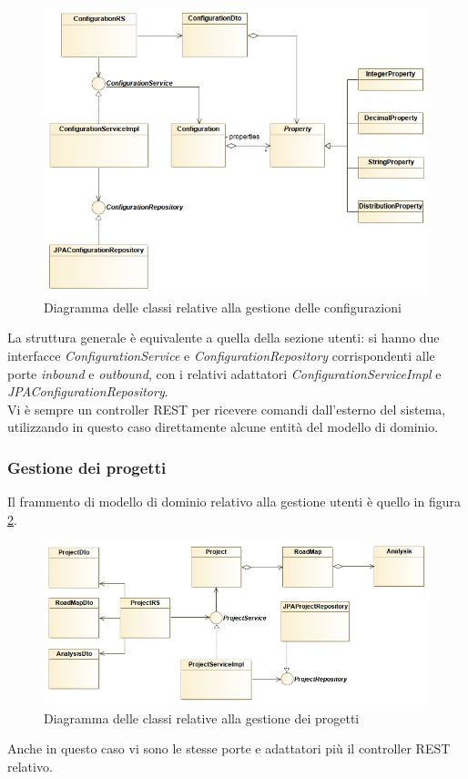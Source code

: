 \begin{figure}[h]
	\centering
	\includegraphics[width=\textwidth]{img/configurations_diagram}
	\caption{Diagramma delle classi relative alla gestione delle configurazioni}
	\label{fig:configurations_diagram}
\end{figure}

La struttura generale è equivalente a quella della sezione utenti: si hanno due interfacce \textit{ConfigurationService} e \textit{ConfigurationRepository} corrispondenti alle porte \textit{inbound} e \textit{outbound}, con i relativi adattatori \textit{ConfigurationServiceImpl} e \textit{JPAConfigurationRepository}.\\
Vi è sempre un controller REST per ricevere comandi dall'esterno del sistema, utilizzando in questo caso direttamente alcune entità del modello di dominio.

\subsubsection{Gestione dei progetti}
Il frammento di modello di dominio relativo alla gestione utenti è quello in figura \ref{fig:projects_diagram}.

\begin{figure}[h]
	\centering
	\includegraphics[width=\textwidth]{img/projects_diagram}
	\caption{Diagramma delle classi relative alla gestione dei progetti}
	\label{fig:projects_diagram}
\end{figure}

Anche in questo caso vi sono le stesse porte e adattatori più il controller REST relativo.
